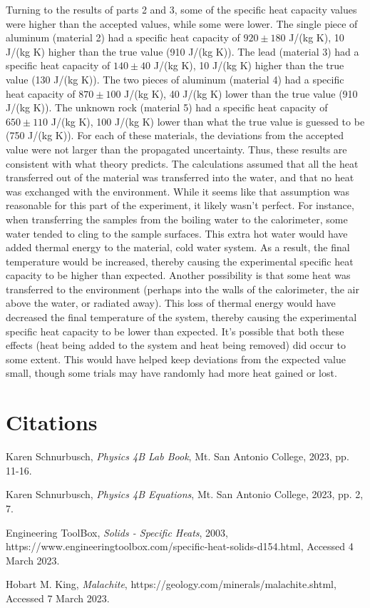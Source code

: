 \documentclass[12pt]{iopart} %
\begin{document}
Turning to the results of parts 2 and 3, some of the specific heat capacity values were higher than the accepted values, while some were lower.
The single piece of aluminum (material 2) had a specific heat capacity of $920 \pm 180$ J/(kg K), 10 J/(kg K) higher than the true value (910 J/(kg K)).
The lead (material 3) had a specific heat capacity of $140 \pm 40$ J/(kg K), 10 J/(kg K) higher than the true value (130 J/(kg K)).
The two pieces of aluminum (material 4) had a specific heat capacity of $870 \pm 100$ J/(kg K), 40 J/(kg K) lower than the true value (910 J/(kg K)).
The unknown rock (material 5) had a specific heat capacity of $650 \pm 110$ J/(kg K), 100 J/(kg K) lower than what the true value is guessed to be (750 J/(kg K)).
For each of these materials, the deviations from the accepted value were not larger than the propagated uncertainty.
Thus, these results are consistent with what theory predicts.
The calculations assumed that all the heat transferred out of the material was transferred into the water, and that no heat was exchanged with the environment.
While it seems like that assumption was reasonable for this part of the experiment, it likely wasn't perfect.
For instance, when transferring the samples from the boiling water to the calorimeter, some water tended to cling to the sample surfaces.
This extra hot water would have added thermal energy to the material, cold water system.
As a result, the final temperature would be increased, thereby causing the experimental specific heat capacity to be higher than expected.
Another possibility is that some heat was transferred to the environment (perhaps into the walls of the calorimeter, the air above the water, or radiated away).
This loss of thermal energy would have decreased the final temperature of the system, thereby causing the experimental specific heat capacity to be lower than expected.
It's possible that both these effects (heat being added to the system and heat being removed) did occur to some extent.
This would have helped keep deviations from the expected value small, though some trials may have randomly had more heat gained or lost.

\section{Citations}

\begin{thebibliography}{9}

  Karen Schnurbusch,
  \textit{Physics 4B Lab Book},
  Mt. San Antonio College,
  2023,
  pp. 11-16.

  Karen Schnurbusch,
  \textit{Physics 4B Equations},
  Mt. San Antonio College,
  2023,
  pp. 2, 7.

  Engineering ToolBox,
  \textit{Solids - Specific Heats},
  2003,
  https://www.engineeringtoolbox.com/specific-heat-solids-d\textunderscore{}154.html,
  Accessed 4 March 2023.

  Hobart M. King,
  \textit{Malachite},
  https://geology.com/minerals/malachite.shtml,
  Accessed 7 March 2023.

\end{thebibliography}
\end{document}
